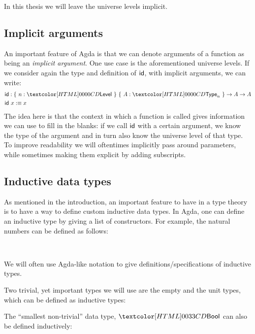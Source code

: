 In this thesis we will leave the universe levels implicit.

\subsection{Implicit arguments}

An important feature of Agda is that we can denote arguments of a
function as being an \emph{implicit argument}. One use case is the
aforementioned universe levels. If we consider again the type and
definition of $\id$, with implicit arguments, we can write:
\begin{align*}
&\id : \{\ n : \Level\ \}\ \{\ A : \Type_n\ \} \to A \to A \\
&\id\ x \ddefeq x
\end{align*}
The idea here is that the context in which a function is called gives
information we can use to fill in the blanks: if we call $\id$ with a
certain argument, we know the type of the argument and in turn also
know the universe level of that type. To improve readability we will
oftentimes implicitly pass around parameters, while sometimes making
them explicit by adding subscripts.

\subsection{Inductive data types}

As mentioned in the introduction, an important feature to have in a
type theory is to have a way to define custom inductive data types. In
Agda, one can define an inductive type by giving a list of
constructors. For example, the natural numbers can be defined as
follows:
\begin{datatype}{\natty}{\Type}
  \constr{\natzero}{\natty} \\
  \constr{\natsucc}{\natty \to \natty}
\end{datatype}
We will often use Agda-like notation to give
definitions/specifications of inductive types.

Two trivial, yet important types we will use are the empty and the
unit types, which can be defined as inductive types:
\begin{datatype}{\emptyty}{\Type}
\end{datatype}
%
\begin{datatype}{\unitty}{\Type}
  \constr{\unitval}{\unitty}
\end{datatype}
%
The ``smallest non-trivial'' data type, $\boolty$ can also be defined
inductively:
\begin{datatype}{\boolty}{\Type}
  \constr{\boolt}{\boolty} \\
  \constr{\boolf}{\boolty}
\end{datatype}

